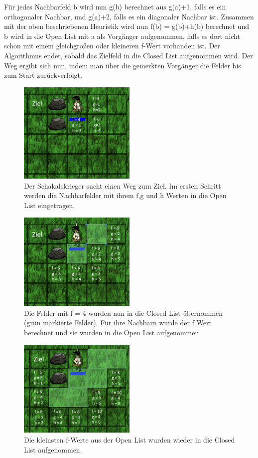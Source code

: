 \documentclass[extern,palatino]{cgBA}
\begin{document}
Für jedes Nachbarfeld b wird nun g(b) berechnet aus g(a)+1, falls es ein orthogonaler Nachbar, und g(a)+2, falls es ein diagonaler Nachbar ist. Zusammen mit der oben beschriebenen Heuristik wird nun f(b) = g(b)+h(b) berechnet und b wird in die Open List mit a als Vorgänger aufgenommen, falls es dort nicht schon mit einem gleichgroßen oder kleineren f-Wert vorhanden ist. Der Algorithmus endet, sobald das Zielfeld in die Closed List aufgenommen wird. Der Weg ergibt sich nun, indem man über die gemerkten Vorgänger die Felder bis zum Start zurückverfolgt.
\begin{figure}[htb]
	\centering
	\includegraphics[width=0.5\textwidth]{pathfinding1.png}
	\caption{Der Schakalskrieger sucht einen Weg zum Ziel. Im ersten Schritt werden die Nachbarfelder mit ihrem f,g und h Werten in die Open List eingetragen.}
	\label{pathfinding1}
\end{figure}
\begin{figure}
	\centering
	\includegraphics[width=0.5\textwidth]{pathfinding2.png}
	\caption{Die Felder mit f = 4 wurden nun in die Closed List übernommen (grün markierte Felder). Für ihre Nachbarn wurde der f Wert berechnet und sie wurden in die Open List aufgenommen}
	\label{pathfinding2}
\end{figure}
\begin{figure}
	\centering
	\includegraphics[width=0.5\textwidth]{pathfinding3.png}
	\caption{Die kleinsten f-Werte aus der Open List wurden wieder in die Closed List aufgenommen.}
	\label{pathfinding3}
\end{figure}
\end{document}
